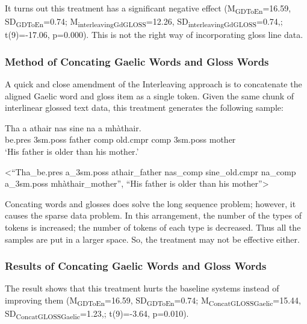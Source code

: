 \documentclass[a4paper]{article}
\begin{document}

It turns out this treatment has a significant negative effect
(M\textsubscript{GDToEn}=16.59, SD\textsubscript{GDToEn}=0.74; M\textsubscript{interleavingGdGLOSS}=12.26, SD\textsubscript{interleavingGdGLOSS}=0.74,; t(9)=-17.06, p=0.000). This is not the right way of incorporating gloss line data. 


\subsubsection{Method of Concating Gaelic Words and Gloss Words }\label{treatment:Concating}
A quick and close amendment of the Interleaving approach is to concatenate the aligned Gaelic word and gloss item as a single token. Given the same chunk of interlinear glossed text data, this treatment generates the following sample:

\begin{exe} 
\ex 
	\begin{xlist}
	\ex 
		\gll	 Tha a athair nas sine na a mh\`athair.\\  
     		     be.pres 3sm.poss father comp old.cmpr comp 3sm.poss mother \\
    	\glt    `His father is older than his mother.'  

    \ex <``Tha\_be.pres a\_3sm.poss athair\_father nas\_comp sine\_old.cmpr na\_comp a\_3sm.poss mh\`athair\_mother'', ``His father is older than his mother''>
    \end{xlist}
\end{exe}

Concating words and glosses does solve the long sequence problem; however, it causes the sparse data problem. In this arrangement, the number of the types of tokens is increased; the number of tokens of each type is decreased. Thus all the samples are put in a larger space. So, the treatment may not be effective either. 

\subsubsection{Results of Concating Gaelic Words and Gloss Words}

The result shows that this treatment hurts the baseline systems instead of improving them (M\textsubscript{GDToEn}=16.59, SD\textsubscript{GDToEn}=0.74; M\textsubscript{ConcatGLOSSGaelic}=15.44, SD\textsubscript{ConcatGLOSSGaelic}=1.23,; t(9)=-3.64, p=0.010).
\end{document}
